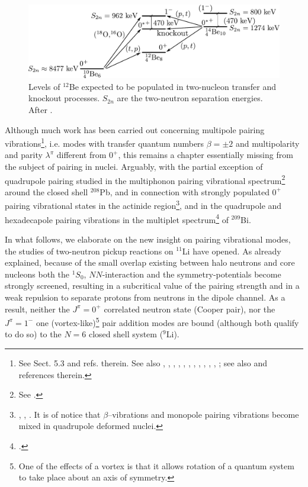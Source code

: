\begin{subappendices}
\begin{figure}
\includegraphics[width=\textwidth]{C8/figsC8/figa4_newnew.pdf}
\caption{Levels of $^{12}$Be expected to be populated in two-nucleon transfer and knockout processes. $S_{2n}$ are the two-neutron separation energies. After \cite{Broglia:16}.}\label{fig6.I.4}
\end{figure}




Although much work has been carried out concerning multipole pairing vibrations\footnote{\label{f38C7} See \cite{Brink:05} Sect. 5.3 and refs. therein. See also  \cite{Broglia:74}, \cite{Ragnarsson:76}, \cite{Broglia:71b}, \cite{Broglia:71c}, \cite{Bes:71d}, \cite{Bes:71}, \cite{Flynn:71}, \cite{Bes:72}, \cite{Broglia:81c}, \cite{Bohr:74b}, \cite{Flynn:72},  \cite{Bortignon:76}; see also \cite{Kubo:70} and references therein.}, i.e. modes with transfer quantum numbers $\beta=\pm2$ and multipolarity and parity $\lambda^\pi$ different from $0^+$, this remains a chapter essentially missing from the subject of pairing in nuclei. Arguably, with the partial exception of quadrupole pairing studied in the multiphonon pairing vibrational spectrum\footnote{\label{f39C7} See \cite{Flynn:72}.} around the closed shell $^{208}$Pb, and in connection with strongly populated $0^+$ pairing vibrational states in the actinide region\footnote{\label{f40C7} \cite{Casten:72}, \cite{Bes:72}, \cite{Ragnarsson:76}. It is of notice that $\beta$--vibrations and monopole pairing vibrations become mixed in quadrupole deformed nuclei.}, and in  the quadrupole and hexadecapole pairing vibrations in the multiplet spectrum\footnote{\cite{Bortignon:76}.} of $^{209}$Bi.

In what follows, we  elaborate on the new insight on pairing vibrational modes, the studies of two-neutron pickup reactions on $^{11}$Li have opened. As already explained, because of the small overlap existing between halo neutrons and core nucleons both the $^1S_0$, $NN$-interaction and the symmetry-potentials become strongly screened, resulting in a subcritical value of the pairing strength and in a weak repulsion to separate protons from neutrons in the dipole channel.
As a result, neither the $J^{\pi}=0^+$ correlated neutron state  (Cooper pair), nor the $J^\pi=1^-$ one (vortex-like)\footnote{One of the effects of a vortex is that it allows rotation of a quantum system to take place about an axis of symmetry.} pair addition modes are bound 
(although both qualify to do so) to the $N=6$ closed shell system ($^{9}$Li). 





\end{subappendices}
